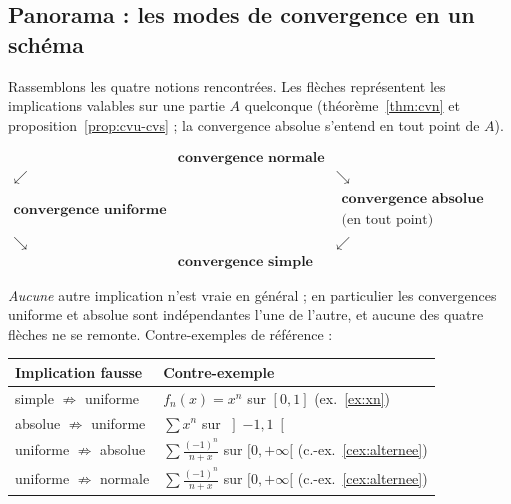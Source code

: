 \documentclass[11pt,a4paper]{article}
\theoremstyle{plain}
\theoremstyle{definition}
\theoremstyle{remark}
\numberwithin{equation}{section}
\begin{document}
\subsection{Panorama : les modes de convergence en un schéma}
\label{subsec:panorama}

Rassemblons les quatre notions rencontrées. Les flèches représentent les
implications valables sur une partie $A$ quelconque (théorème~\ref{thm:cvn}
et proposition~\ref{prop:cvu-cvs} ; la convergence absolue s'entend en
tout point de $A$).

\begin{center}
$\begin{array}{ccc}
 & \textbf{convergence normale} & \\[1.5mm]
\swarrow & & \searrow \\[1.5mm]
\textbf{convergence uniforme} & &
\begin{array}{c}\textbf{convergence absolue}\\ \text{(en tout point)}\end{array} \\[1.5mm]
\searrow & & \swarrow \\[1.5mm]
 & \textbf{convergence simple} &
\end{array}$
\end{center}

\emph{Aucune} autre implication n'est vraie en général ; en particulier
les convergences uniforme et absolue sont indépendantes l'une de l'autre,
et aucune des quatre flèches ne se remonte. Contre-exemples de référence :

\begin{center}
\begin{tabular}{|l|l|}
\hline
\textbf{Implication fausse} & \textbf{Contre-exemple} \\
\hline
simple $\not\Rightarrow$ uniforme &
$f_n(x)=x^n$ sur $[0,1]$ (ex.~\ref{ex:xn}) \\
\hline
absolue $\not\Rightarrow$ uniforme &
$\sum x^n$ sur $\left]-1,1\right[$ \\
\hline
uniforme $\not\Rightarrow$ absolue &
$\sum \frac{(-1)^n}{n+x}$ sur $[0,+\infty[$ (c.-ex.~\ref{cex:alternee}) \\
\hline
uniforme $\not\Rightarrow$ normale &
$\sum \frac{(-1)^n}{n+x}$ sur $[0,+\infty[$ (c.-ex.~\ref{cex:alternee}) \\
\hline
\end{tabular}
\end{center}
\end{document}
